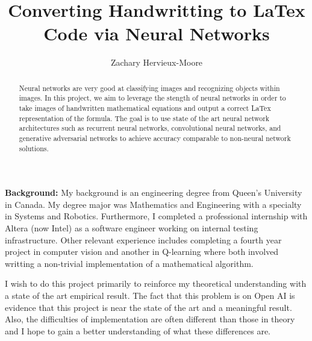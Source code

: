 \documentclass[12pt]{article}
\title{Converting Handwritting to LaTex Code via Neural Networks}
\author{Zachary Hervieux-Moore}
\date{\displaydate{date}}
\theoremstyle{colon}
\begin{document}
\maketitle

\begin{abstract}
  Neural networks are very good at classifying images and recognizing objects within images. In this project, we aim to leverage the stength of neural networks in order to take images of handwritten mathematical equations and output a correct LaTex representation of the formula. The goal is to use state of the art neural network architectures such as recurrent neural networks, convolutional neural networks, and generative adversarial networks to achieve accuracy comparable to non-neural network solutions.
\end{abstract}

\textbf{Background:}
My background is an engineering degree from Queen's University in Canada. My degree major was Mathematics and Engineering with a specialty in Systems and Robotics. Furthermore, I completed a professional internship with Altera (now Intel) as a software engineer working on internal testing infrastructure. Other relevant experience includes completing a fourth year project in computer vision and another in Q-learning where both involved writting a non-trivial implementation of a mathematical algorithm.

I wish to do this project primarily to reinforce my theoretical understanding with a state of the art empirical result. The fact that this problem is on Open AI is evidence that this project is near the state of the art and a meaningful result. Also, the difficulties of implementation are often different than those in theory and I hope to gain a better understanding of what these differences are.
\end{document}
